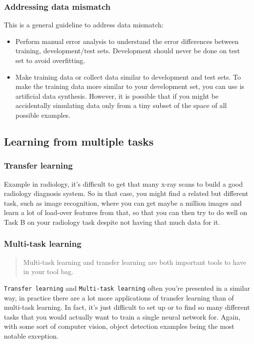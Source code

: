 \subsubsection{Addressing data mismatch}
This is a general guideline to address data mismatch:
\begin{itemize}
    \item Perform manual error analysis to understand the error differences between training,
development/test sets. Development should never be done on test set to avoid overfitting.
    \item Make training data or collect data similar to development and test sets. To make the training data more similar to your development set, you can use is artificial data synthesis. However, it is possible that if you might be accidentally simulating data only from a tiny subset of the space of all possible examples.
\end{itemize}

\subsection{Learning from multiple tasks}
\subsubsection{Transfer learning}
Example in radiology, it's difficult to get that many x-ray scans to build a good radiology diagnosis system. So in that case, you might find a related but different task, such as image recognition, where you can get maybe a million images and learn a lot of load-over features from that, so that you can then try to do well on Task B on your radiology task despite not having that much data for it.

\subsubsection{Multi-task learning}
\begin{quote}
    Multi-task learning and transfer learning are both important tools to have in your tool bag.
\end{quote}
\texttt{Transfer learning} and \texttt{Multi-task learning} often you're presented in a similar way, in practice there are a lot more applications of transfer learning than of multi-task learning. In fact, it's just difficult to set up or to find so many different tasks that you would actually want to train a single neural network for. Again, with some sort of computer vision, object detection examples being the most notable exception. 

